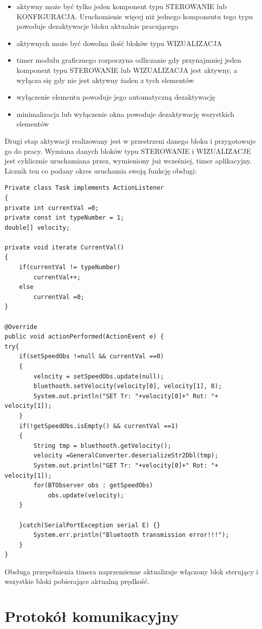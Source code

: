 \documentclass[eng,printmode]{mgr}
\begin{document}
\begin{itemize}
 \item aktywny może być tylko jeden komponent typu STEROWANIE lub KONFIGURACJA. Uruchomienie więcej niż jednego komponentu tego typu powoduje dezaktywacje bloku aktualnie pracującego
 \item aktywnych może być dowolna ilość bloków typu WIZUALIZACJA
 \item timer modułu graficznego rozpoczyna odliczanie gdy przynajmniej jeden komponent typu STEROWANIE lub WIZUALIZACJA jest aktywny, a wyłącza się gdy nie jest aktywny żaden z tych elementów
 \item wyłączenie elementu powoduje jego automatyczną dezaktywację
 \item minimalizacja lub wyłączenie okna powoduje dezaktywację wszystkich elementów
\end{itemize}

Drugi etap aktywacji realizowany jest w przestrzeni danego bloku i przygotowuje go do pracy. Wymiana danych  bloków typu STEROWANIE  i WIZUALIZACJE jest  cyklicznie uruchamiana przez, wymieniony już wcześniej,  timer aplikacyjny. Licznik ten co podany okres uruchamia swoją funkcję obsługi:

\begin{lstlisting}[style=java]
Private class Task implements ActionListener
{
private int currentVal =0;
private const int typeNumber = 1; 
double[] velocity;
		
private void iterate CurrentVal()
{
	if(currentVal != typeNumber)
		currentVal++;
	else
		currentVal =0;
}
		
@Override
public void actionPerformed(ActionEvent e) {
try{	
	if(setSpeedObs !=null && currentVal ==0)
	{
		velocity = setSpeedObs.update(null);
		bluethooth.setVelocity(velocity[0], velocity[1], 0);
		System.out.println("SET Tr: "+velocity[0]+" Rot: "+ velocity[1]);
	}
	if(!getSpeedObs.isEmpty() && currentVal ==1)
	{
		String tmp = bluethooth.getVelocity();
		velocity =GeneralConverter.deserializeStr2Dbl(tmp);
		System.out.println("GET Tr: "+velocity[0]+" Rot: "+ velocity[1]);
		for(BTObserver obs : getSpeedObs)
			obs.update(velocity);
	}
				
	}catch(SerialPortException serial E) {}
		System.err.println("Bluetooth transmission error!!!");	
	}
}
\end{lstlisting}
Obsługa przepełnienia timera naprzemienne aktualizuje włączony blok sterujący i  wszystkie bloki pobierające aktualną prędkość.

\chapter{Protokół komunikacyjny}  
\end{document}
